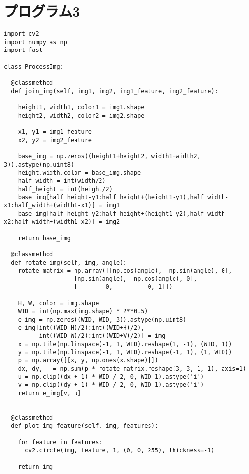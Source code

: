 \section{プログラム3}
\begin{lstlisting}[caption=サブプログラム]
import cv2
import numpy as np
import fast

class ProcessImg:

  @classmethod
  def join_img(self, img1, img2, img1_feature, img2_feature):

    height1, width1, color1 = img1.shape
    height2, width2, color2 = img2.shape

    x1, y1 = img1_feature
    x2, y2 = img2_feature

    base_img = np.zeros((height1+height2, width1+width2, 3)).astype(np.uint8)
    height,width,color = base_img.shape
    half_width = int(width/2)
    half_height = int(height/2)
    base_img[half_height-y1:half_height+(height1-y1),half_width-x1:half_width+(width1-x1)] = img1
    base_img[half_height-y2:half_height+(height1-y2),half_width-x2:half_width+(width1-x2)] = img2

    return base_img

  @classmethod
  def rotate_img(self, img, angle):
    rotate_matrix = np.array([[np.cos(angle), -np.sin(angle), 0],
                    [np.sin(angle),  np.cos(angle), 0],
                    [        0,          0, 1]])

    H, W, color = img.shape
    WID = int(np.max(img.shape) * 2**0.5)
    e_img = np.zeros((WID, WID, 3)).astype(np.uint8)
    e_img[int((WID-H)/2):int((WID+H)/2),
          int((WID-W)/2):int((WID+W)/2)] = img
    x = np.tile(np.linspace(-1, 1, WID).reshape(1, -1), (WID, 1))
    y = np.tile(np.linspace(-1, 1, WID).reshape(-1, 1), (1, WID))
    p = np.array([[x, y, np.ones(x.shape)]])
    dx, dy, _ = np.sum(p * rotate_matrix.reshape(3, 3, 1, 1), axis=1)
    u = np.clip((dx + 1) * WID / 2, 0, WID-1).astype('i')
    v = np.clip((dy + 1) * WID / 2, 0, WID-1).astype('i')
    return e_img[v, u]


  @classmethod
  def plot_img_feature(self, img, features):

    for feature in features:
      cv2.circle(img, feature, 1, (0, 0, 255), thickness=-1)
    
    return img

\end{lstlisting}
